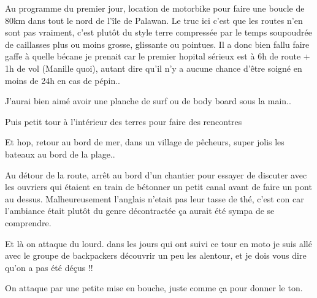 \begin{multicols}{2}
Au programme du premier jour, location de motorbike pour faire une boucle de 80km dans tout le nord de l'île de Palawan. Le truc ici c'est que les routes n'en sont pas vraiment, c'est plutôt du style terre compressée par le temps soupoudrée de caillasses plus ou moins grosse, glissante ou pointues. Il a donc bien fallu faire gaffe à quelle bécane je prenait car le premier hopital sérieux est à 6h de route + 1h de vol (Manille quoi), autant dire qu'il n'y a aucune chance d'être soigné en moins de 24h en cas de pépin..


J'aurai bien aimé avoir une planche de surf ou de body board sous la main..


Puis petit tour à l'intérieur des terres pour faire des rencontres


Et hop, retour au bord de mer, dans un village de pêcheurs, super jolis les bateaux au bord de la plage..


Au détour de la route, arrêt au bord d'un chantier pour essayer de discuter avec les ouvriers qui étaient en train de bétonner un petit canal avant de faire un pont au dessus. Malheureusement l'anglais n'etait pas leur tasse de thé, c'est con car l'ambiance était plutôt du genre décontractée ça aurait été sympa de se comprendre.


Et là on attaque du lourd. dans les jours qui ont suivi ce tour en moto je suis allé avec le groupe de backpackers découvrir un peu les alentour, et je dois vous dire qu'on a pas été déçus !!

On attaque par une petite mise en bouche, juste comme ça pour donner le ton.



\end{multicols}

